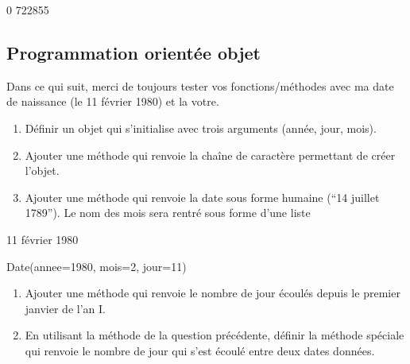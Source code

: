 \documentclass[letterpaper,10pt,english]{sphinxhowto}
\begin{document}
\begin{sphinxVerbatim}[commandchars=\\\{\}]
0
722855
\end{sphinxVerbatim}


\subsection{Programmation orientée objet}
\label{\detokenize{devoir_maison_Devoir Maison:programmation-orientee-objet}}
\sphinxAtStartPar
Dans ce qui suit, merci de toujours tester vos fonctions/méthodes avec ma date de naissance (le 11 février 1980) et la votre.
\begin{enumerate}
%
\setcounter{enumi}{4}
\item {} 
\sphinxAtStartPar
Définir un objet  qui s’initialise avec trois arguments (année, jour, mois).

\item {} 
\sphinxAtStartPar
Ajouter une méthode  qui renvoie la chaîne de caractère permettant de créer l’objet.

\item {} 
\sphinxAtStartPar
Ajouter une méthode  qui renvoie la date sous forme humaine (“14 juillet 1789”). Le nom des mois sera rentré sous forme d’une liste

\end{enumerate}

\begin{sphinxVerbatim}[commandchars=\\\{\}]
    

\end{sphinxVerbatim}

\begin{sphinxVerbatim}[commandchars=\\\{\}]
11 février 1980
\end{sphinxVerbatim}

\begin{sphinxVerbatim}[commandchars=\\\{\}]
Date(annee=1980, mois=2, jour=11)
\end{sphinxVerbatim}
\begin{enumerate}
%
\setcounter{enumi}{7}
\item {} 
\sphinxAtStartPar
Ajouter une méthode qui renvoie le nombre de jour écoulés depuis le premier janvier de l’an I.

\item {} 
\sphinxAtStartPar
En utilisant la méthode de la question précédente, définir la méthode spéciale  qui renvoie le nombre de jour qui s’est écoulé entre deux dates données.

\end{enumerate}
\end{document}
